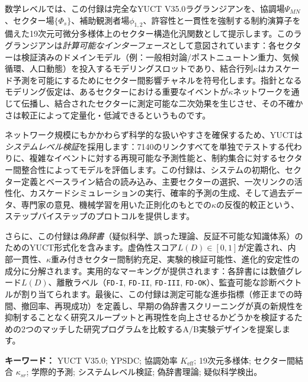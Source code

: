 \documentclass[13pt,a4paper]{ltjsarticle}
\newcommand{\Keff}{K_{\mathrm{eff}}}
\begin{document}
\begin{titlepage}
\begin{center}
\begin{minipage}{0.92\textwidth}
				数学レベルでは、この付録は完全なYUCT V35.0ラグランジアンを、協調場$\Psi_{MN}$、セクター場$\{\Phi_s\}$、補助観測者場$\phi_{1,2}$、許容性と一貫性を強制する制約演算子を備えた19次元可微分多様体上のセクター構造化汎関数として提示します。このラグランジアンは\emph{計算可能なインターフェース}として意図されています：各セクターは検証済みのドメインモデル（例：一般相対論/ポストニュートン重力、気候循環、人口動態）を投入するモデリングスロットであり、結合行列$\kappa$はカスケード予測を可能にするためにセクター間影響チャネルを符号化します。指針となるモデリング仮定は、あるセクターにおける重要なイベントが$\kappa$ネットワークを通じて伝播し、結合されたセクターに測定可能な二次効果を生じさせ、その不確かさは較正によって定量化・低減できるというものです。
				
				ネットワーク規模にもかかわらず科学的な扱いやすさを確保するため、YUCTは\emph{システムレベル検証}を採用します：7140のリンクすべてを単独でテストする代わりに、複雑なイベントに対する再現可能な予測性能と、制約集合に対するセクター間整合性によってモデルを評価します。この付録は、システムの初期化、セクター定義とベースライン結合の読み込み、主要セクターの選択、一次リンクの活性化、カスケードシミュレーションの実行、確率的予測の生成、そして過去データ、専門家の意見、機械学習を用いた正則化のもとでの$\kappa$の反復的較正という、ステップバイステップのプロトコルを提供します。
				
				さらに、この付録は\emph{偽辞書}（疑似科学、誤った理論、反証不可能な知識体系）のためのYUCT形式化を含みます。虚偽性スコア$L(D)\in[0,1]$が定義され、内部一貫性、$\kappa$重み付きセクター間制約充足、実験的検証可能性、進化的安定性の成分に分解されます。実用的なマーキングが提供されます：各辞書には数値グレード$L(D)$、離散ラベル（\texttt{FD-I}, \texttt{FD-II}, \texttt{FD-III}, \texttt{FD-OK}）、監査可能な診断ベクトルが割り当てられます。最後に、この付録は測定可能な進歩指標（修正までの時間、撤回率、再現成功）を定義し、早期の偽辞書スクリーニングが真の新規性を抑制することなく研究スループットと再現性を向上させるかどうかを検証するための2つのマッチした研究プログラムを比較するA/B実験デザインを提案します。
			\end{minipage}
			
			\vfill
			\small
			\textbf{キーワード：} YUCT V35.0; YPSDC; 協調効率 $\Keff$; 19次元多様体; セクター間結合 $\kappa_{sr}$; 学際的予測; システムレベル検証; 偽辞書理論; 疑似科学検出。
		\end{center}
	\end{titlepage}
	
\end{document}
